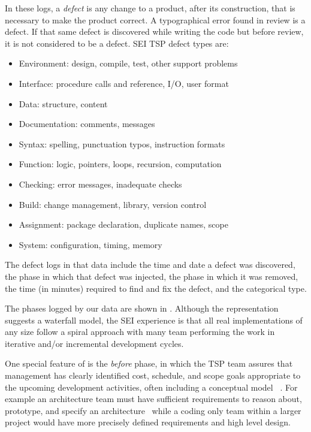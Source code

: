 In these logs, a  \emph{defect} is any change to a product, after its construction, that is necessary to make the product correct.  A typographical error found in review is a defect. If that same defect is discovered while writing the code but before review, it is not considered to be a defect. 
SEI TSP defect types are:
\begin{itemize}
\item Environment: design, compile, test,  other support  problems
\item Interface: procedure calls and reference, I/O, user format
\item Data: structure, content
\item Documentation: comments, messages
\item Syntax: spelling, punctuation typos, instruction formats
\item Function: logic, pointers, loops, recursion, computation  
\item Checking: error messages, inadequate checks
\item Build: change management, library, version control
\item Assignment: package
declaration, duplicate names, scope
\item System: configuration, timing, memory
\end{itemize}
The defect logs in that data  include the time and date a defect was discovered, the phase in which that defect was injected, the phase in which it was removed, the time (in minutes) required to find and fix the defect, and the categorical type.

The phases logged by our data are shown in .
 Although the representation suggests a waterfall model, the SEI experience is that all real implementations of any size follow a spiral approach with many team performing the work in iterative and/or incremental development cycles.

One special feature of   is
the {\em before} phase, in which the TSP team assures that management has clearly identified cost, schedule, and scope goals appropriate to the upcoming development activities, often including a conceptual model ~\cite{Humphrey:2005}. For example an architecture team must have sufficient requirements to reason about, prototype, and specify an architecture~\cite{Bachmann13} while a coding only team within a larger project would have more precisely defined requirements and high level design.
 
